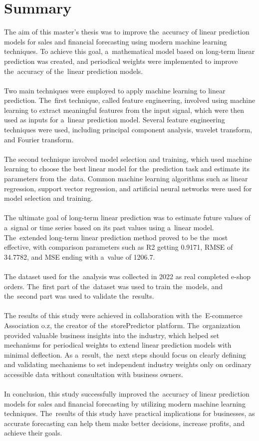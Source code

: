 
\chapter{Summary} \label{summary}
The aim of this master's thesis was to improve the~accuracy of linear prediction models for sales
and financial forecasting using modern machine learning techniques. To achieve this goal, a~mathematical
model based on long-term linear prediction was created, and periodical weights were implemented
to improve the~accuracy of the~linear prediction models.\\
\\
Two main techniques were employed to apply machine learning to linear prediction. The~first technique,
called feature engineering, involved using machine learning to extract meaningful features from
the input signal, which were then used as inputs for a~linear prediction model. Several feature
engineering techniques were used, including principal component analysis, wavelet transform, and
Fourier transform.\\
\\
The second technique involved model selection and training, which used machine learning to choose
the best linear model for the~prediction task and estimate its parameters from the~data. Common machine
learning algorithms such as linear regression, support vector regression, and artificial neural networks
were used for model selection and training.\\
\\
The ultimate goal of long-term linear prediction was to estimate future values of a~signal or time
series based on its past values using a~linear model. The~extended long-term linear prediction method
proved to be the~most effective, with comparison parameters such as R2 getting 0.9171, RMSE of 34.7782, and MSE ending
with a~value of 1206.7.\\
\\
The dataset used for the~analysis was collected in 2022 as real completed e-shop orders. The~first part of the~dataset
was used to train the~models, and the~second part was used to validate the~results.\\
\\
The results of this study were achieved in collaboration with the~E-commerce Association o.z,
the creator of the~storePredictor platform. The~organization provided valuable business insights into
the industry, which helped set mechanisms for periodical weights to extend linear prediction models
with minimal deflection. As a~result, the~next steps should focus on clearly defining and validating
mechanisms to set independent industry weights only on ordinary accessible data without consultation
with business owners.\\
\\
In conclusion, this study successfully improved the~accuracy of linear prediction models for sales
and financial forecasting by utilizing modern machine learning techniques. The~results of this study
have practical implications for businesses, as accurate forecasting can help them make better decisions,
increase profits, and achieve their goals.

